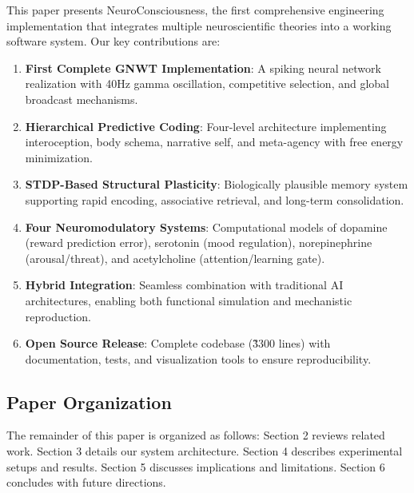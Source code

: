 \documentclass[twocolumn,10pt]{article}
\begin{document}
This paper presents NeuroConsciousness, the first comprehensive engineering implementation that integrates multiple neuroscientific theories into a working software system. Our key contributions are:

\begin{enumerate}
    \item \textbf{First Complete GNWT Implementation}: A spiking neural network realization with 40Hz gamma oscillation, competitive selection, and global broadcast mechanisms.
    
    \item \textbf{Hierarchical Predictive Coding}: Four-level architecture implementing interoception, body schema, narrative self, and meta-agency with free energy minimization.
    
    \item \textbf{STDP-Based Structural Plasticity}: Biologically plausible memory system supporting rapid encoding, associative retrieval, and long-term consolidation.
    
    \item \textbf{Four Neuromodulatory Systems}: Computational models of dopamine (reward prediction error), serotonin (mood regulation), norepinephrine (arousal/threat), and acetylcholine (attention/learning gate).
    
    \item \textbf{Hybrid Integration}: Seamless combination with traditional AI architectures, enabling both functional simulation and mechanistic reproduction.
    
    \item \textbf{Open Source Release}: Complete codebase (\~3300 lines) with documentation, tests, and visualization tools to ensure reproducibility.
\end{enumerate}

\subsection{Paper Organization}

The remainder of this paper is organized as follows: Section 2 reviews related work. Section 3 details our system architecture. Section 4 describes experimental setups and results. Section 5 discusses implications and limitations. Section 6 concludes with future directions.

\end{document}
